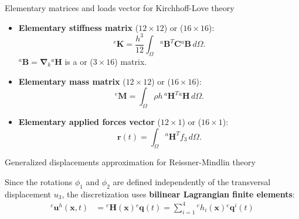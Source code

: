 \documentclass[aspectratio=169]{beamer}
\begin{document}
{  \begin{frame}{Elementary matrices and loads vector for Kirchhoff-Love theory}
    \begin{itemize}
      \item \textbf{Elementary stiffness matrix} ($12\times 12$) or ($16\times 16$):
            $$
              {}^e\mathbf K =\frac{h^3}{12}\int_\Omega {}^a\mathbf B^T\mathbf C{}^a\mathbf B \, d\Omega.
            $$
            ${}^a\mathbf B=\boldsymbol\nabla_k{}^a\mathbf H$ is a  or ($3\times 16$) matrix.
      \item \textbf{Elementary mass matrix} ($12\times 12$) or ($16\times 16$):
            $${}^e\mathbf M  =\int_\Omega \rho h\, {}^a\mathbf H^T{}^a\mathbf H \, d\Omega.$$
      \item \textbf{Elementary applied forces vector} ($12\times 1$)  or ($16\times 1$):
            $$\mathbf r(t)  =\int_{\Omega} {}^a\mathbf H^{T}f_3\, d\Omega.$$
    \end{itemize}
  \end{frame}

  \begin{frame}{Generalized displacements approximation for Reissner-Mindlin theory}
    \begin{block}{}
      Since the rotations $\phi_1$ and $\phi_2$ are defined independently of the transversal displacement $u_3$, the discretization uses \textbf{bilinear Lagrangian finite elements}:
      \vspace{-0.3cm}
      \begin{align*}
        {}^e \mathbf u^{h}(\mathbf x,t) & ={}^e \mathbf H(\mathbf x){}^e\mathbf q(t) = \sum_{i=1}^{4}{}^eh_{i}(\mathbf x){}^e\mathbf q^{i}(t)
      \end{align*}
      \vspace{-0.4cm}


\end{block}
\end{frame}}
\end{document}
